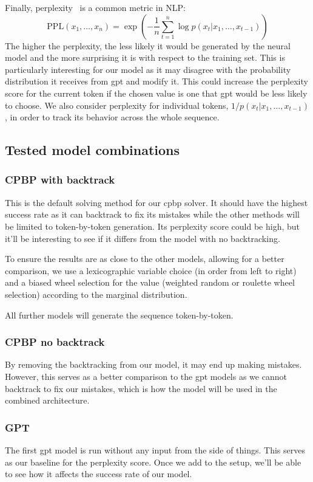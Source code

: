 \documentclass[../Document.tex]{subfiles}
\begin{document}
Finally, perplexity~\cite{perplexity} is a common metric in NLP:
$$
    \mbox{PPL}(x_1,\ldots,x_n) = \exp \left( - \frac{1}{n} \sum_{t=1}^n \log  p(x_t | x_1,\ldots,x_{t-1}) \right)
$$
The higher the perplexity, the less likely it would be generated by the neural model and the more surprising it is with respect to the training set.
This is particularly interesting for our \cp model as it may disagree with the probability distribution it receives from \gls{gpt} and modify it. This could increase the perplexity score for the current token if the chosen value is one that \gls{gpt} would be less likely to choose.
We also consider perplexity for individual tokens, $1/p(x_t | x_1,\ldots,x_{t-1})$, in order to track its behavior across the whole sequence.


\subsection{Tested model combinations}

\subsubsection{CPBP with backtrack}
This is the default solving method for our \gls{cpbp} solver.
It should have the highest success rate as it can backtrack to fix its mistakes while the other methods will be limited to token-by-token generation.
Its perplexity score could be high, but it'll be interesting to see if it differs from the \cp model with no backtracking.

To ensure the results are as close to the other models, allowing for a better comparison, we use a lexicographic variable choice (\ie in order from left to right) and a biased wheel selection for the value (\ie weighted random or roulette wheel selection) according to the marginal distribution.

All further models will generate the sequence token-by-token.

\subsubsection{CPBP no backtrack}
By removing the backtracking from our model, it may end up making mistakes.
However, this serves as a better comparison to the \gls{gpt} models as we cannot backtrack to fix our mistakes, which is how the \cp model will be used in the combined architecture.

\subsubsection{GPT}
The first \gls{gpt} model is run without any input from the \cp side of things.
This serves as our baseline for the perplexity score.
Once we add \cp to the setup, we'll be able to see how it affects the success rate of our model.
\end{document}
